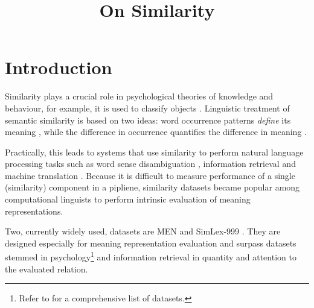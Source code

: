 \documentclass[11pt]{article}
\title{On Similarity}
\date{}
\begin{document}
\maketitle

\begin{abstract}

\end{abstract}

\section{Introduction}
\label{sec:introduction}

Similarity plays a crucial role in psychological theories of knowledge and behaviour, for example, it is used to classify objects \cite{hahn1997concepts}.
Linguistic treatment of semantic similarity is based on two ideas: word occurrence patterns \emph{define} its meaning \cite{firth1957lingtheory}, while the difference in occurrence \textup{quantifies} the difference in meaning \cite{harris1954distributional}.

Practically, this leads to systems that use similarity to perform natural language processing tasks such as word sense disambiguation \cite{Schutze:1998:AWS:972719.972724}, information retrieval \cite{Salton:1975:VSM:361219.361220} and machine translation \cite{Dagan:1993:CWS:981574.981596}. Because it is difficult to measure performance of a single (similarity) component in a pipliene, similarity datasets became popular among computational linguists to perform intrinsic evaluation of meaning representations.

Two, currently widely used, datasets are MEN \cite{Bruni:2012:DST:2390524.2390544} and SimLex-999 \cite{hill2014simlex}. They are designed especially for meaning representation evaluation and surpass datasets stemmed in psychology\footnote{Refer to  for a comprehensive list of datasets.} and information retrieval \cite{2002:PSC:503104.503110} in quantity and attention to the evaluated relation.
\end{document}
